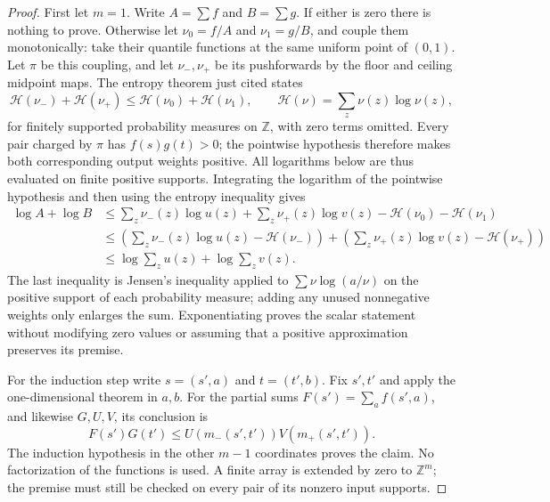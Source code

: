 \documentclass[11pt]{article}
\theoremstyle{definition}
\theoremstyle{remark}
\numberwithin{equation}{section}
\begin{document}
\begin{proof}
First let $m=1$.  Write $A=\sum f$ and $B=\sum g$.
If either is zero there is nothing to prove.  Otherwise let
$\nu_0=f/A$ and $\nu_1=g/B$, and couple them monotonically: take
their quantile functions at the same uniform point of $(0,1)$.
Let $\pi$ be this coupling, and let $\nu_-,\nu_+$ be its pushforwards
by the floor and ceiling midpoint maps.  The entropy theorem just
cited states
\[
 \mathcal H(\nu_-)+\mathcal H(\nu_+)
 \le\mathcal H(\nu_0)+\mathcal H(\nu_1),
 \qquad \mathcal H(\nu)=\sum_z\nu(z)\log\nu(z),
\]
for finitely supported probability measures on $\mathbb Z$, with zero terms
omitted.  Every pair charged by $\pi$ has $f(s)g(t)>0$; the
pointwise hypothesis therefore makes both corresponding output weights
positive.  All logarithms below are thus evaluated on finite positive
supports.  Integrating the logarithm of the pointwise hypothesis and
then using the entropy inequality gives
\begin{align*}
 \log A+\log B
 &\le\sum_z\nu_-(z)\log u(z)+\sum_z\nu_+(z)\log v(z)
            -\mathcal H(\nu_0)-\mathcal H(\nu_1)\\
 &\le\left(\sum_z\nu_-(z)\log u(z)-\mathcal H(\nu_-)\right)
     +\left(\sum_z\nu_+(z)\log v(z)-\mathcal H(\nu_+)\right)\\
 &\le\log\sum_z u(z)+\log\sum_z v(z).
\end{align*}
The last inequality is Jensen's inequality applied to
$\sum\nu\log(a/\nu)$ on the positive support of each probability
measure; adding any unused nonnegative weights only enlarges the sum.
Exponentiating proves the scalar statement without modifying zero
values or assuming that a positive approximation preserves its premise.

For the induction step write $s=(s',a)$ and $t=(t',b)$.  Fix $s',t'$
and apply the one-dimensional theorem in $a,b$.  For the partial sums
$F(s')=\sum_a f(s',a)$, and likewise $G,U,V$, its conclusion is
\[
 F(s')G(t')\leq
 U(m_-(s',t'))V(m_+(s',t')).
\]
The induction hypothesis in the other $m-1$ coordinates proves the
claim.  No factorization of the functions is used.  A finite array is
extended by zero to $\mathbb Z^m$; the premise must still be checked on every
pair of its nonzero input supports.
\end{proof}
\end{document}
